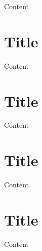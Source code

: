 \documentclass[
]{book}
\begin{document}
Content

\hypertarget{title-9}{%
\chapter{Title}\label{title-9}}

Content

\hypertarget{title-10}{%
\chapter{Title}\label{title-10}}

Content

\hypertarget{title-11}{%
\chapter{Title}\label{title-11}}

Content

\hypertarget{title-12}{%
\chapter{Title}\label{title-12}}

Content

  
\end{document}
